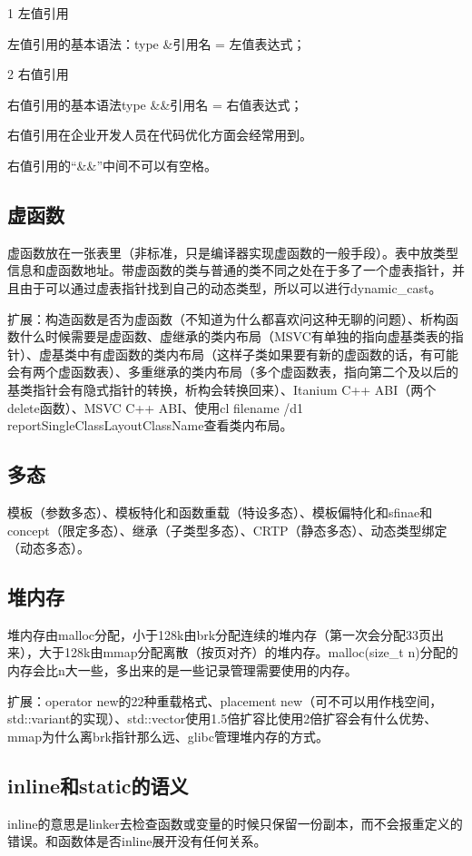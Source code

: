 1 左值引用

左值引用的基本语法：type \&引用名 = 左值表达式；

2 右值引用

右值引用的基本语法type \&\&引用名 = 右值表达式；

右值引用在企业开发人员在代码优化方面会经常用到。

右值引用的“\&\&”中间不可以有空格。

\subsection{虚函数}

虚函数放在一张表里（非标准，只是编译器实现虚函数的一般手段）。表中放类型信息和虚函数地址。带虚函数的类与普通的类不同之处在于多了一个虚表指针，并且由于可以通过虚表指针找到自己的动态类型，所以可以进行dynamic\_cast。

扩展：构造函数是否为虚函数（不知道为什么都喜欢问这种无聊的问题）、析构函数什么时候需要是虚函数、虚继承的类内布局（MSVC有单独的指向虚基类表的指针）、虚基类中有虚函数的类内布局（这样子类如果要有新的虚函数的话，有可能会有两个虚函数表）、多重继承的类内布局（多个虚函数表，指向第二个及以后的基类指针会有隐式指针的转换，析构会转换回来）、Itanium C++ ABI（两个delete函数）、MSVC C++ ABI、使用cl filename /d1 reportSingleClassLayoutClassName查看类内布局。

\subsection{多态}

模板（参数多态）、模板特化和函数重载（特设多态）、模板偏特化和sfinae和concept（限定多态）、继承（子类型多态）、CRTP（静态多态）、动态类型绑定（动态多态）。

\subsection{堆内存}

堆内存由malloc分配，小于128k由brk分配连续的堆内存（第一次会分配33页出来），大于128k由mmap分配离散（按页对齐）的堆内存。malloc(size\_t n)分配的内存会比n大一些，多出来的是一些记录管理需要使用的内存。

扩展：operator new的22种重载格式、placement new（可不可以用作栈空间，std::variant的实现）、std::vector使用1.5倍扩容比使用2倍扩容会有什么优势、mmap为什么离brk指针那么远、glibc管理堆内存的方式。

\subsection{inline和static的语义}
inline的意思是linker去检查函数或变量的时候只保留一份副本，而不会报重定义的错误。和函数体是否inline展开没有任何关系。

